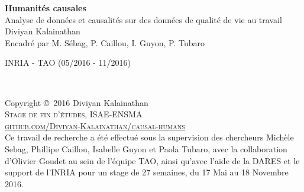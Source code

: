\documentclass[11pt,fleqn,a4paper,openany,frenchb]{book} %
\begin{document}

\begingroup
\thispagestyle{empty}
\centering
\vspace*{5cm}
\par\normalfont\fontsize{35}{35}\sffamily\selectfont
\textbf{Humanités causales}\\
{\LARGE Analyse de données et causalités sur des données de qualité de vie au travail} \\%
\vspace*{0.5cm}
{\Huge Diviyan Kalainathan}\\
{\huge Encadré par M. Sébag, P. Caillou, I. Guyon, P. Tubaro}\par %
{\Large INRIA - TAO (05/2016 - 11/2016)}\par
\endgroup


\newpage
~\vfill
\thispagestyle{empty}

\noindent Copyright \copyright\ 2016 Diviyan Kalainathan\\ %

\noindent \textsc{Stage de fin d'études, ISAE-ENSMA}\\

\noindent \textsc{\href{https://github.com/Diviyan-Kalainathan/causal-humans}{github.com/Diviyan-Kalainathan/causal-humans}}\\ %


\noindent Ce travail de recherche a été effectué sous la supervision des chercheurs Michèle Sebag, Phillipe Caillou, Isabelle Guyon et Paola Tubaro, avec la collaboration  d'Olivier Goudet au sein de l'équipe TAO, ainsi qu'avec l'aide de la DARES et le support de l'INRIA pour un stage de 27 semaines, du 17 Mai au 18 Novembre 2016. \\ %


\end{document}
